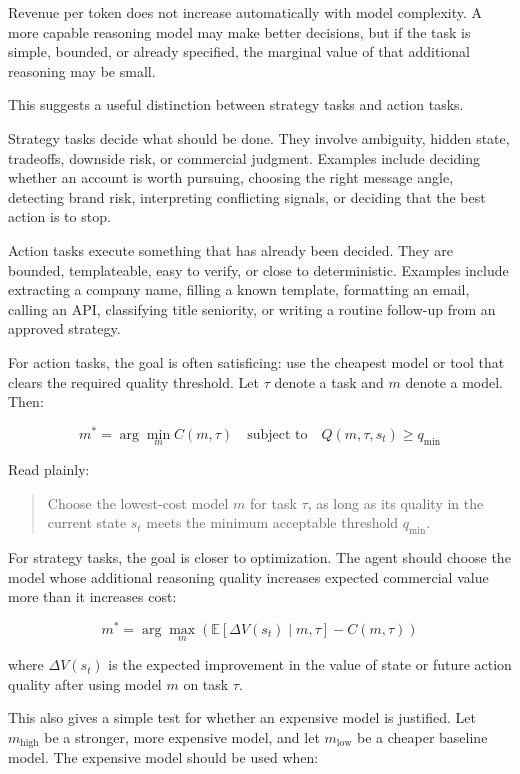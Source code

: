 \documentclass[12pt]{article}
\begin{document}
Revenue per token does not increase automatically with model complexity. A more
capable reasoning model may make better decisions, but if the task is simple,
bounded, or already specified, the marginal value of that additional reasoning
may be small.

This suggests a useful distinction between strategy tasks and action tasks.

Strategy tasks decide what should be done. They involve ambiguity, hidden state,
tradeoffs, downside risk, or commercial judgment. Examples include deciding
whether an account is worth pursuing, choosing the right message angle, detecting
brand risk, interpreting conflicting signals, or deciding that the best action is
to stop.

Action tasks execute something that has already been decided. They are bounded,
templateable, easy to verify, or close to deterministic. Examples include
extracting a company name, filling a known template, formatting an email, calling
an API, classifying title seniority, or writing a routine follow-up from an
approved strategy.

For action tasks, the goal is often satisficing: use the cheapest model or tool
that clears the required quality threshold. Let \(\tau\) denote a task and \(m\)
denote a model. Then:

\[
m^*
=
\arg\min_m C(m, \tau)
\quad
\text{subject to}
\quad
Q(m, \tau, s_t) \geq q_{\min}
\]

Read plainly:

\begin{quote}
    Choose the lowest-cost model \(m\) for task \(\tau\), as long as its quality
    in the current state \(s_t\) meets the minimum acceptable threshold
    \(q_{\min}\).
\end{quote}

For strategy tasks, the goal is closer to optimization. The agent should choose
the model whose additional reasoning quality increases expected commercial value
more than it increases cost:

\[
m^*
=
\arg\max_m
\left(
\mathbb{E}[\Delta V(s_t) \mid m, \tau]
-
C(m, \tau)
\right)
\]

where \(\Delta V(s_t)\) is the expected improvement in the value of state or
future action quality after using model \(m\) on task \(\tau\).

This also gives a simple test for whether an expensive model is justified. Let
\(m_{\text{high}}\) be a stronger, more expensive model, and let
\(m_{\text{low}}\) be a cheaper baseline model. The expensive model should be
used when:
\end{document}
